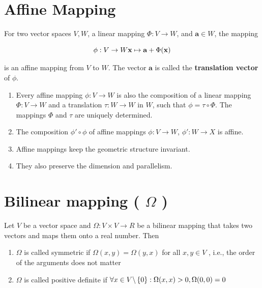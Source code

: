 

\section{Affine Mapping \cite{mfml-1}}\label{Affine Mapping}

For two vector spaces $V, W$, a linear mapping $\Phi : V \to W$, and $\mathbf{a} \in W$, the mapping

\[
    \hfill
    \phi : V \to W
    \hfill
    \mathbf{x} \mapsto \mathbf{a} + \Phi(\mathbf{x})
    \hfill
\]

is an affine mapping from $V$ to $W$. The vector $\mathbf{a}$ is called the \textbf{translation vector} of $\phi$.

\begin{enumerate}
    \item Every affine mapping $\phi : V \to W$ is also the composition of a linear mapping $\Phi : V \to W$ and a translation $\tau : W \to W$ in $W$, such that $\phi = \tau \circ \Phi$. The mappings $\Phi$ and $\tau$ are uniquely determined.

    \item The composition $\phi' \circ \phi$ of affine mappings $\phi : V \to W$, $\phi': W \to X$ is affine.

    \item Affine mappings keep the geometric structure invariant. 
    
    \item They also preserve the dimension and parallelism.
\end{enumerate}


\section{Bilinear mapping ( $\Omega$ )}\label{Bilinear mapping}

Let $V$ be a vector space and $\Omega  : V × V \to R$ be a bilinear mapping that takes two vectors and maps them onto a real number. Then
\begin{enumerate}
    \item $\Omega$  is called symmetric if $\Omega (x, y) = \Omega (y, x)$ for all $x, y \in  V$ , i.e., the order of the arguments does not matter

    \item $\Omega$  is called positive definite if $\forall x \in  V\backslash \left\{0\right\} : \Omega (x, x) > 0 , \Omega (0, 0) = 0$
\end{enumerate}


